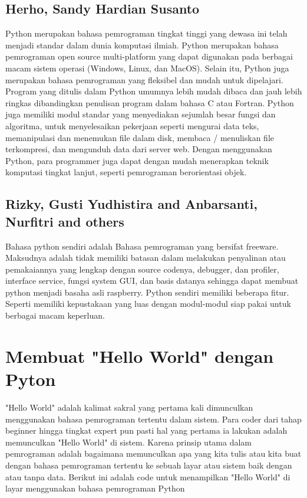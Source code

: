 \documentclass[12pt]{article}
\begin{document}
\subsection{Herho, Sandy Hardian Susanto}
Python merupakan bahasa pemrograman tingkat tinggi yang dewasa ini telah menjadi standar dalam dunia komputasi ilmiah. Python merupakan bahasa pemrograman open source multi-platform yang dapat digunakan pada berbagai macam sistem operasi (Windows, Linux, dan MacOS). Selain itu, Python juga merupakan bahasa pemrograman yang fleksibel dan mudah untuk dipelajari. Program yang ditulis dalam Python umumnya lebih mudah dibaca dan jauh lebih ringkas dibandingkan penulisan program dalam bahasa C atau Fortran. Python juga memiliki modul standar yang menyediakan sejumlah besar fungsi dan algoritma, untuk menyelesaikan pekerjaan seperti mengurai data teks, memanipulasi dan menemukan file dalam disk, membaca / menuliskan file terkompresi, dan mengunduh data dari server web. Dengan menggunakan Python, para programmer juga dapat dengan mudah menerapkan teknik komputasi tingkat lanjut, seperti pemrograman berorientasi objek\cite{herho2018tutorial}.

\subsection{Rizky, Gusti Yudhistira and Anbarsanti, Nurfitri and others}
Bahasa python sendiri adalah Bahasa pemrograman yang bersifat freeware. Maksudnya adalah tidak memiliki batasan dalam melakukan penyalinan atau pemakaiannya yang lengkap dengan source codenya, debugger, dan profiler, interface service, fungsi system GUI, dan basis datanya sehingga dapat membuat python menjadi basaha asli raspberry. Python sendiri memiliki beberapa fitur. Seperti memiliki kepustakaan yang luas dengan modul-modul siap pakai untuk berbagai macam keperluan\cite{rizky2016desain}. 

\section{Membuat "Hello World" dengan Pyton}
"Hello World" adalah kalimat sakral yang pertama kali dimunculkan menggunakan bahasa pemrograman tertentu dalam sistem. Para coder dari tahap beginner hingga tingkat expert pun pasti hal yang pertama ia lakukan adalah memunculkan "Hello World" di sistem. Karena prinsip utama dalam pemrograman adalah bagaimana memunculkan apa yang kita tulis atau kita buat dengan bahasa pemrograman tertentu ke sebuah layar atau sistem baik dengan atau tanpa data.
Berikut ini adalah code untuk menampilkan "Hello World" di layar menggunakan bahasa pemrograman Python
\end{document}
